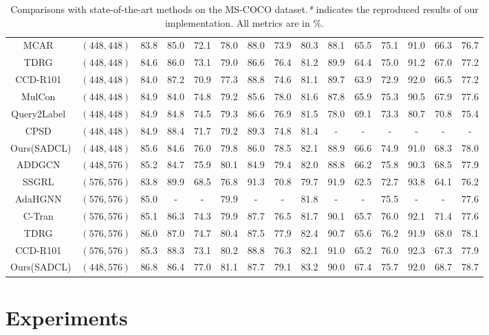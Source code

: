 \documentclass{ecai}
\begin{document}
\begin{table*}[!ht]
{{\begin{tabular}{c|c|c| cccccc | cccccc }
			MCAR~\cite{gao2021learning}      &$(448,448)$  & 83.8 & 85.0 & 72.1 & 78.0 & 88.0 & 73.9 & 80.3 & 88.1 & 65.5 & 75.1 & 91.0 & 66.3 & 76.7 \\
TDRG~\cite{Zhao2021ICCV}         &$(448,448)$  & 84.6 & 86.0 & 73.1 & 79.0 & 86.6 & 76.4 & 81.2 & 89.9 & 64.4 & 75.0 & 91.2 & 67.0 & 77.2 \\
			CCD-R101~\cite{liu2022contextual}&$(448,448)$  & 84.0 & 87.2 & 70.9 & 77.3 & 88.8 & 74.6 & 81.1 & 89.7 & 63.9 & 72.9 & 92.0 & 66.5 & 77.2 \\
MulCon~\cite{dao2021multi}       &$(448,448)$  & 84.9 & 84.0 & 74.8 & 79.2 & 85.6 & 78.0 & 81.6 & 87.8 & 65.9 & 75.3 & 90.5 & 67.9 & 77.6 \\ 
			Query2Label~\cite{liu2021q2l}    &$(448,448)$  & 84.9 & 84.8 & 74.5 & 79.3 & 86.6 & 76.9 & 81.5 & 78.0 & 69.1 & 73.3 & 80.7 & 70.8 & 75.4 \\
			CPSD~\cite{huang2022cpsd}        &$(448,448)$  & 84.9 & 88.4 & 71.7 & 79.2 & 89.3 & 74.8 & 81.4 & -    & -    & -    & -    & -    & -    \\
\hline
\rowcolor{iyellow}Ours(SADCL)      &$(448,448)$  & 85.6 & 84.6 & 76.0 & 79.8 & 86.0 & 78.5 & 82.1 & 88.9 & 66.6 & 74.9 & 91.0 & 68.3 & 78.0 \\	\hline \hline
			ADDGCN~\cite{ye2020attention}    &$(448,576)$  & 85.2 & 84.7 & 75.9 & 80.1 & 84.9 & 79.4 & 82.0 & 88.8 & 66.2 & 75.8 & 90.3 & 68.5 & 77.9 \\
			SSGRL~\cite{Chen2019ICCV}        &$(576,576)$  & 83.8 & 89.9 & 68.5 & 76.8 & 91.3 & 70.8 & 79.7 & 91.9 & 62.5 & 72.7 & 93.8 & 64.1 & 76.2 \\
			AdaHGNN~\cite{wu2020adahgnn}     &$(576,576)$  & 85.0 &  -   & -    & 79.9 &  -   &   -  & 81.8 &   -  &  -   & 75.5 &  -   &  -   & 77.6 \\
			C-Tran~\cite{Tianlu2021Ctran}    &$(576,576)$  & 85.1 & 86.3 & 74.3 & 79.9 & 87.7 & 76.5 & 81.7 & 90.1 & 65.7 & 76.0 & 92.1 & 71.4 & 77.6 \\
			TDRG~\cite{Zhao2021ICCV}         &$(576,576)$  & 86.0 & 87.0 & 74.7 & 80.4 & 87.5 & 77.9 & 82.4 & 90.7 & 65.6 & 76.2 & 91.9 & 68.0 & 78.1 \\
			CCD-R101~\cite{liu2022contextual}&$(576,576)$  & 85.3 & 88.3 & 73.1 & 80.2 & 88.8 & 76.3 & 82.1 & 91.0 & 65.2 & 76.0 & 92.3 & 67.3 & 77.9 \\    \hline 
			\rowcolor{iyellow}Ours(SADCL)      &$(448,576)$  & 86.8 & 86.4 & 77.0 & 81.1 & 87.7 & 79.1 & 83.2 & 90.0 & 67.4 & 75.7 & 92.0 & 68.7 & 78.7 \\	\hline
			
\end{tabular}
		}
		\caption{Comparisons with state-of-the-art methods on the MS-COCO dataset.\emph{*} indicates the reproduced results of our implementation. All metrics are in \%.}
		\label{table: COCO benchmark}
	}
\end{table*} \section{Experiments}
\end{document}
